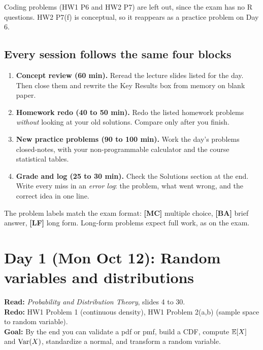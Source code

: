 \documentclass[11pt]{article}
\begin{document}
Coding problems (HW1 P6 and HW2 P7) are left out, since the exam has no R questions. HW2 P7(f) is conceptual, so it reappears as a practice problem on Day 6.

\subsection{Every session follows the same four blocks}
\begin{enumerate}[label=\textbf{\arabic*.}]
  \item \textbf{Concept review (60 min).} Reread the lecture slides listed for the day. Then close them and rewrite the Key Results box from memory on blank paper.
  \item \textbf{Homework redo (40 to 50 min).} Redo the listed homework problems \emph{without} looking at your old solutions. Compare only after you finish.
  \item \textbf{New practice problems (90 to 100 min).} Work the day's problems closed-notes, with your non-programmable calculator and the course statistical tables.
  \item \textbf{Grade and log (25 to 30 min).} Check the Solutions section at the end. Write every miss in an \emph{error log}: the problem, what went wrong, and the correct idea in one line.
\end{enumerate}

\noindent The problem labels match the exam format: \textbf{[MC]} multiple choice, \textbf{[BA]} brief answer, \textbf{[LF]} long form. Long-form problems expect full work, as on the exam.

\clearpage
\section{Day 1 (Mon Oct 12): Random variables and distributions}

\begin{planbox}
\textbf{Read:} \emph{Probability and Distribution Theory}, slides 4 to 30.\\
\textbf{Redo:} HW1 Problem 1 (continuous density), HW1 Problem 2(a,b) (sample space to random variable).\\
\textbf{Goal:} By the end you can validate a pdf or pmf, build a CDF, compute $\mathbb{E}[X]$ and $\operatorname{Var}(X)$, standardize a normal, and transform a random variable.
\end{planbox}
\end{document}
